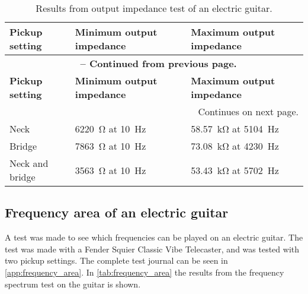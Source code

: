 \begin{longtable}[h!]{ |m{}| 
          m{}| 
          m{}|   } 
\caption{Results from output impedance test of an electric guitar.} \label{tab:impedance_test} \\ 
 
\hline 
\textbf{Pickup setting} & \textbf{Minimum output impedance} & \textbf{Maximum output impedance} \\ 
\hline 
\endfirsthead     
\multicolumn{3}{c}{{{\footnotesize \bfseries \tablename\ \thetable{} -- Continued from previous page.}}} \\  
\hline 
\textbf{Pickup setting} & \textbf{Minimum output impedance} & \textbf{Maximum output impedance} \\ 
\hline 
\endhead       
\hline \multicolumn{3}{|r|}{{Continues on next page.}} \\ \hline 
\endfoot     
\hline 
\endlastfoot 
Neck & \SI{6220}{\ohm} at \SI{10}{\hertz} & \SI{58,57}{\kilo\ohm} at \SI{5104}{\hertz} \\ \hline
Bridge & \SI{7863}{\ohm} at \SI{10}{\hertz}  & \SI{73.08}{\kilo\ohm} at \SI{4230}{\hertz}\\ \hline
Neck and bridge & \SI{3563}{\ohm} at \SI{10}{\hertz} & \SI{53.43}{\kilo\ohm} at \SI{5702}{\hertz}\\ \hline
\end{longtable}

\subsection{Frequency area of an electric guitar}
A test was made to see which frequencies can be played on an electric guitar. The test was made with a Fender Squier Classic Vibe Telecaster, and was tested with two pickup settings. The complete test journal can be seen in \autoref{app:frequency_area}. In \autoref{tab:frequency_area} the results from the frequency spectrum test on the guitar is shown.

